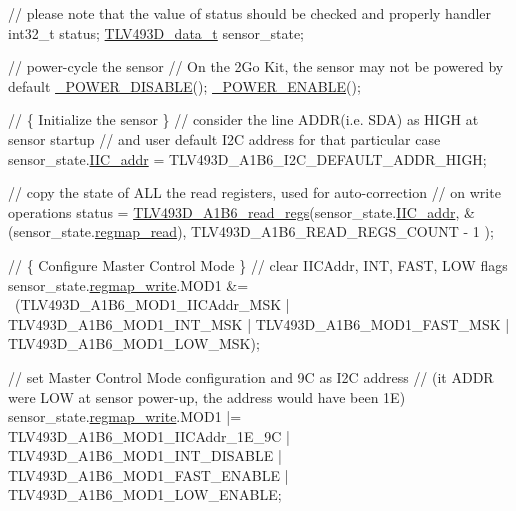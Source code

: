 \begin{DoxyCode}
\textcolor{comment}{// please note that the value of status should be checked and properly handler}
int32\_t status;
\mbox{\hyperlink{struct_t_l_v493_d__data__t}{TLV493D\_data\_t}} sensor\_state;


\textcolor{comment}{// power-cycle the sensor}
\textcolor{comment}{// On the 2Go Kit, the sensor may not be powered by default}
\mbox{\hyperlink{interface_8h_abadb0076439c5df777bd4e545d82dcce}{\_POWER\_DISABLE}}();
\mbox{\hyperlink{interface_8h_a049c9e0574db2668751f73dcacaacfe7}{\_POWER\_ENABLE}}();

\textcolor{comment}{// \{ Initialize the sensor \}}
\textcolor{comment}{// consider the line ADDR(i.e. SDA) as HIGH at sensor startup}
\textcolor{comment}{// and user default I2C address for that particular case}
sensor\_state.\mbox{\hyperlink{struct_t_l_v493_d__data__t_a047c4ab12450e0186489f3bfadc8cbc4}{IIC\_addr}} = TLV493D\_A1B6\_I2C\_DEFAULT\_ADDR\_HIGH;

\textcolor{comment}{// copy the state of ALL the read registers, used for auto-correction}
\textcolor{comment}{// on write operations}
status = \mbox{\hyperlink{_t_l_v___a1_b6__driver_8c_a80bcc62ca392203dbdabcd529f35c35b}{TLV493D\_A1B6\_read\_regs}}(sensor\_state.\mbox{\hyperlink{struct_t_l_v493_d__data__t_a047c4ab12450e0186489f3bfadc8cbc4}{IIC\_addr}},
                               &(sensor\_state.\mbox{\hyperlink{struct_t_l_v493_d__data__t_a8160052cc383f9ec602c96f41922952b}{regmap\_read}}),
                               TLV493D\_A1B6\_READ\_REGS\_COUNT - 1
);

\textcolor{comment}{// \{ Configure Master Control Mode \}}
\textcolor{comment}{// clear IICAddr, INT, FAST, LOW flags}
sensor\_state.\mbox{\hyperlink{struct_t_l_v493_d__data__t_aa17835fca124976dc402c4305da2b724}{regmap\_write}}.MOD1 &= ~(TLV493D\_A1B6\_MOD1\_IICAddr\_MSK
                                   | TLV493D\_A1B6\_MOD1\_INT\_MSK
                                   | TLV493D\_A1B6\_MOD1\_FAST\_MSK
                                   | TLV493D\_A1B6\_MOD1\_LOW\_MSK);

\textcolor{comment}{// set Master Control Mode configuration and 9C as I2C address}
\textcolor{comment}{// (it ADDR were LOW at sensor power-up, the address would have been 1E)}
sensor\_state.\mbox{\hyperlink{struct_t_l_v493_d__data__t_aa17835fca124976dc402c4305da2b724}{regmap\_write}}.MOD1 |= TLV493D\_A1B6\_MOD1\_IICAddr\_1E\_9C
                                  | TLV493D\_A1B6\_MOD1\_INT\_DISABLE
                                  | TLV493D\_A1B6\_MOD1\_FAST\_ENABLE
                                  | TLV493D\_A1B6\_MOD1\_LOW\_ENABLE;


\end{DoxyCode}
